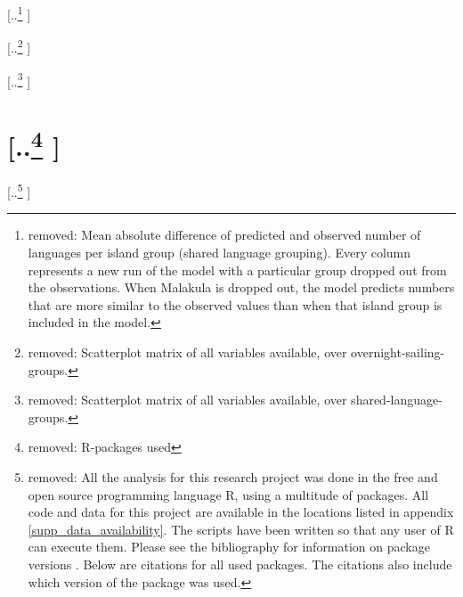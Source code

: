 \documentclass[unnumsec,webpdf,modern,medium]{oup-authoring-template}
\providecommand{\DIFdeltex}[1]{{\protect\color{red} [..\footnote{removed: #1} ]}} %
\providecommand{\DIFdelFL}[1]{\DIFdel{#1}} %
\providecommand{\DIFdel}[1]{\texorpdfstring{\DIFdeltex{#1}}{}} %
\begin{document}

{%
\DIFdelFL{Mean absolute difference of predicted and observed number of languages per island group (shared language grouping). Every column represents a new run of the model with a particular group dropped out from the observations. When Malakula is dropped out, the model predicts numbers that are more similar to the observed values than when that island group is included in the model.}}

{%
\DIFdelFL{Scatterplot matrix of all variables available, over overnight-sailing-groups.}}

{%
\DIFdelFL{Scatterplot matrix of all variables available, over shared-language-groups.}}


\section{\DIFdel{R-packages used}}
\addtocounter{section}{-1}%

\DIFdel{All the analysis for this research project was done in the free and open source programming language R, using a multitude of packages. All code and data for this project are available in the locations listed in appendix \ref{supp_data_availability}. The scripts have been written so that any user of R can execute them. Please see the bibliography for information on package versions . Below are citations for all used packages.
The citations also include which version of the package was used.
}%
\end{document}
